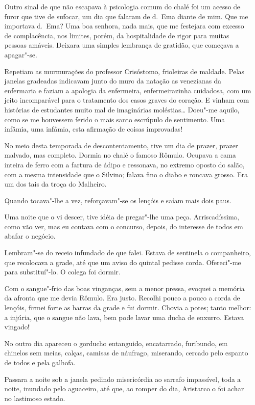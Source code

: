Outro sinal de que
não escapava à psicologia comum do chalé foi um acesso de furor que
tive de sufocar, um dia que falaram de d.~Ema diante de mim. Que me
importava d.~Ema? Uma boa senhora, nada mais, que me festejara com
excesso de complacência, nos limites, porém, da hospitalidade de rigor
para muitas pessoas amáveis. Deixara uma simples lembrança de gratidão,
que começava a apagar"-se. 

Repetiam as murmurações do professor
Crisóstomo, frioleiras de maldade. Pelas janelas gradeadas indicavam
junto do muro da natação as venezianas da enfermaria e faziam a
apologia da enfermeira, enfermeirazinha cuidadosa, com um jeito
incomparável para o tratamento dos casos graves do coração. E vinham
com histórias de estudantes muito mal de imaginárias moléstias\ldots{}
Doeu"-me aquilo, como se me houvessem ferido o mais santo escrúpulo de
sentimento. Uma infâmia, uma
infâmia, esta afirmação de coisas improvadas! 

No meio desta temporada de
descontentamento, tive um dia de prazer, prazer malvado, mas completo.
Dormia no chalé o famoso Rômulo. Ocupava a cama inteira de ferro com a
fartura de ádipo e ressonava, no extremo oposto do salão, com a mesma
intensidade que o Silvino; falava fino o diabo e roncava grosso. Era um
dos tais da troça do Malheiro. 

Quando tocava"-lhe a vez,
reforçavam"-se os lençóis e saíam mais dois paus. 

Uma noite que o vi
descer, tive idéia de pregar"-lhe uma peça. Arriscadíssima, como vão
ver, mas eu contava com o concurso, depois, do interesse de todos em
abafar o negócio. 

Lembram"-se do receio infundado de que falei. Estava
de sentinela o companheiro, que recolocava a grade, até que um aviso do
quintal pedisse corda. Ofereci"-me para substituí"-lo. O colega foi
dormir. 

Com o sangue"-frio das boas vinganças, sem a menor pressa,
evoquei a memória da afronta que me devia Rômulo. Era justo. Recolhi
pouco a pouco a corda de lençóis, firmei forte as barras da grade e fui
dormir. Chovia a potes; tanto melhor: a injúria, que o sangue não lava,
bem pode lavar uma ducha de enxurro. Estava vingado! 

No outro dia
apareceu o gorducho entanguido, encatarrado, furibundo, em chinelos sem
meias, calças, camisas de náufrago, miserando, cercado pelo espanto de
todos e pela galhofa. 

Passara a noite sob a janela pedindo misericórdia
ao sarrafo impassível, toda a noite, inundado pelo aguaceiro, até que,
ao romper do dia, Aristarco o foi achar no lastimoso estado. 

